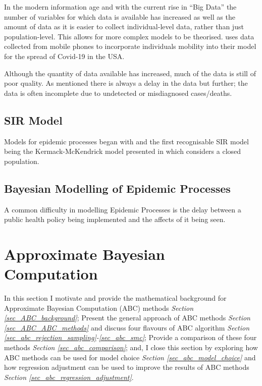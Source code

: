 \documentclass[11pt,a4paper]{article}
\theoremstyle{break}
\begin{document}
  \par In the modern information age and with the current rise in ``Big Data'' the number of variables for which data is available has increased as well as the amount of data as it is easier to collect individual-level data, rather than just population-level. This allows for more complex models to be theorised.  \cite[]{association_between_mobility_patterns_and_covid_19_transmission_in_the_usa} uses data collected from mobile phones to incorporate individuals mobility into their model for the spread of Covid-19 in the USA.

  \par Although the quantity of data available has increased, much of the data is still of poor quality. As mentioned there is always a delay in the data but further; the data is often incomplete due to undetected or misdiagnosed cases/deaths.


\subsection{SIR Model}

  \par Models for epidemic processes began with \cite[]{application_of_the_theory_of_probabilities_to_the_study_of_a_prior_pathometry_part_i,application_of_the_theory_of_probabilities_to_the_study_of_a_prior_pathometry_part_ii} and the first recognisable SIR model being the Kermack-McKendrick model presented in \cite[]{contribution_to_the_mathematical_theory_of_epidemics} which considers a closed population.


\subsection{Bayesian Modelling of Epidemic Processes}

  \par A common difficulty in modelling Epidemic Processes is the delay between a public health policy being implemented and the affects of it being seen. %

\newpage
\section{Approximate Bayesian Computation}\label{sec_ABC}

  \par In this section I motivate and provide the mathematical background for Approximate Bayesian Computation (ABC) methods \textit{Section \ref{sec_ABC_background}}; Present the general approach of ABC methods \textit{Section \ref{sec_ABC_ABC_methods}} and discuss four flavours of ABC algorithm \textit{Section \ref{sec_abc_rejection_sampling}-\ref{sec_abc_smc}}; Provide a comparison of these four methods \textit{Section \ref{sec_abc_comparison}}; and, I close this section by exploring how ABC methods can be used for model choice \textit{Section \ref{sec_abc_model_choice}} and how regression adjustment can be used to improve the results of ABC methods \textit{Section \ref{sec_abc_regression_adjustment}}.
\end{document}

